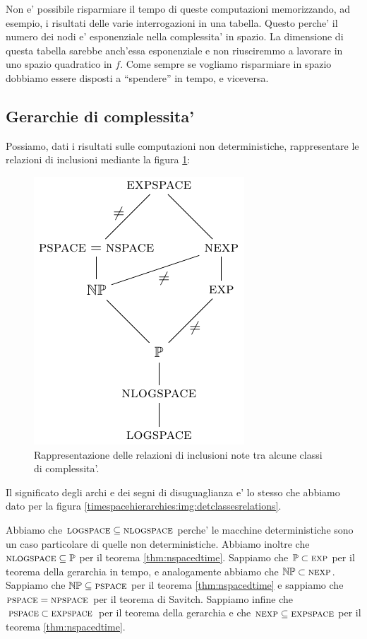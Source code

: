 Non e' possibile risparmiare il tempo di queste computazioni memorizzando, ad esempio, i risultati
delle varie interrogazioni in una tabella. Questo perche' il numero dei nodi e' esponenziale nella
complessita' in spazio. La dimensione di questa tabella sarebbe anch'essa esponenziale e non
riusciremmo a lavorare in uno spazio quadratico in $f$. Come sempre se vogliamo risparmiare in
spazio dobbiamo essere disposti a ``spendere'' in tempo, e viceversa.

\subsection{Gerarchie di complessita'}

Possiamo, dati i risultati sulle computazioni non deterministiche, rappresentare le relazioni di
inclusioni mediante la figura \ref{nondeterminism:img:complexity_hierarchy}:

\begin{figure}[h]
    \begin{center}
        \includegraphics{./img/nondeterminism/Hierarchies.pdf}
        \caption{Rappresentazione delle relazioni di inclusioni note tra alcune classi di
        complessita'.}
        \label{nondeterminism:img:complexity_hierarchy}
    \end{center}
\end{figure}

Il significato degli archi e dei segni di disuguaglianza e' lo stesso che abbiamo dato per la figura
\ref{timespacehierarchies:img:detclassesrelations}.

Abbiamo che $\textsc{logspace} \subseteq \textsc{nlogspace}$ perche' le macchine deterministiche sono un caso
particolare di quelle non deterministiche. Abbiamo inoltre che $\textsc{nlogspace} \subseteq \mathbb{P}$ per il
teorema \ref{thm:nspacedtime}. Sappiamo che $\mathbb{P} \subset \textsc{exp}$ per il teorema della gerarchia in
tempo, e analogamente abbiamo che $\mathbb{NP} \subset \textsc{nexp}$. Sappiamo che $\mathbb{NP} \subseteq \textsc{pspace}$
per il teorema \ref{thm:nspacedtime} e sappiamo che $\textsc{pspace} = \textsc{npspace}$ per il teorema di Savitch.
Sappiamo infine che $\textsc{pspace} \subset \textsc{expspace}$ per il teorema della gerarchia e che $\textsc{nexp}
\subseteq \textsc{expspace}$ per il teorema \ref{thm:nspacedtime}.

